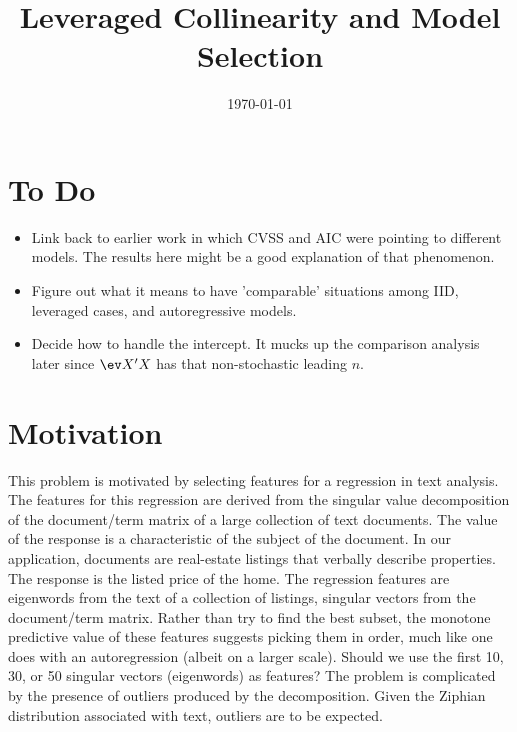 \documentclass[12pt]{article}
\title{ Leveraged Collinearity and Model Selection }
\date{\today}
\begin{document}


\section{ To Do }

\begin{itemize}

 \item Link back to earlier work in which CVSS and AIC were pointing to
 different models. The results here might be a good explanation of that
 phenomenon.

 \item Figure out what it means to have 'comparable' situations among IID,
 leveraged cases, and autoregressive models.

 \item Decide how to handle the intercept. It mucks up the comparison analysis
 later since $\ev X'X$ has that non-stochastic leading $n$.

\end{itemize}


\section{ Motivation }
\label{sec:motivation}

 This problem is motivated by selecting features for a regression in text
 analysis.  The features for this regression are derived from the singular value
 decomposition of the document/term matrix of a large collection of text
 documents.  The value of the response is a characteristic of the subject of the
 document.  In our application, documents are real-estate listings that verbally
 describe properties.  The response is the listed price of the home.  The
 regression features are eigenwords from the text of a collection of listings,
 singular vectors from the document/term matrix.  Rather than try to find the
 best subset, the monotone predictive value of these features suggests picking
 them in order, much like one does with an autoregression (albeit on a larger
 scale).  Should we use the first 10, 30, or 50 singular vectors (eigenwords) as
 features?  The problem is complicated by the presence of outliers produced by
 the decomposition.  Given the Ziphian distribution associated with text,
 outliers are to be expected.
\end{document}
